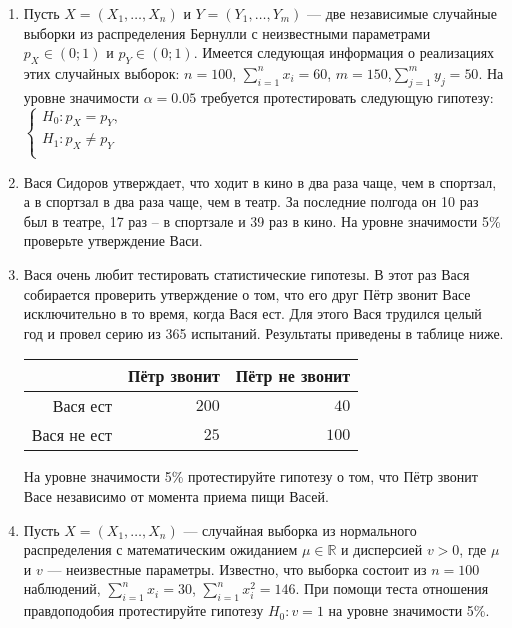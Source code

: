\begin{enumerate}
\item Пусть $X = (X_{1}, \ldots, X_{n})$ и $Y = (Y_{1}, \ldots, Y_{m})$ —
две независимые случайные выборки из распределения Бернулли с неизвестными параметрами $p_{X} \in (0; 1)$ и $p_{Y} \in (0; 1)$.
Имеется следующая информация о реализациях этих случайных выборок: $n = 100$, $\sum_{i=1}^{n} x_{i} = 60$, $m = 150$,$\sum_{j=1}^{m} y_{j} = 50$.
На уровне значимости $\alpha = 0.05$ требуется протестировать следующую гипотезу:
$\begin{cases}
H_{0}:p_{X} = p_{Y}, \\
H_{1}:p_{X} \neq p_{Y} \\
\end{cases}$

\item Вася Сидоров утверждает, что ходит в кино в два раза чаще, чем в спортзал,
а в спортзал в два раза чаще, чем в театр.
За последние полгода он 10 раз был в театре, 17 раз – в спортзале и 39 раз в кино.
На уровне значимости 5\% проверьте утверждение Васи.

\item Вася очень любит тестировать статистические гипотезы.
В этот раз Вася собирается проверить утверждение о том,
что его друг Пётр звонит Васе исключительно в то время, когда Вася ест.
Для этого Вася трудился целый год и провел серию из 365 испытаний.
Результаты приведены в таблице ниже.

\begin{center}\begin{tabular}{r|rr}
\toprule
   & Пётр звонит   & Пётр не звонит  \\ \midrule
Вася ест           & $200$ & $40$ \\
 Вася не ест       & $25$ & $100$  \\ \bottomrule
\end{tabular}\end{center}

На уровне значимости 5\% протестируйте гипотезу о том, что Пётр звонит Васе
независимо от момента приема пищи Васей.

\item Пусть $X = (X_{1}, \ldots, X_{n})$ — случайная выборка из нормального распределения
с математическим ожиданием $\mu \in \mathbb{R}$ и дисперсией $v > 0$, где $\mu$ и $v$ — неизвестные параметры. Известно, что выборка состоит из $n = 100$ наблюдений, $\sum_{i=1}^{n} x_{i} = 30$, $\sum_{i=1}^{n} x^2_{i} = 146$. При помощи теста отношения правдоподобия протестируйте гипотезу $H_{0}:v = 1$ на уровне значимости 5\%.

\end{enumerate}
